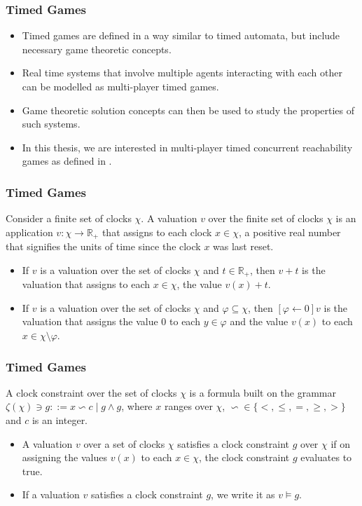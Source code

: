 \documentclass{beamer}
\begin{document}
\begin{frame}
\frametitle{Timed Games}
  \begin{itemize}
 	\item Timed games are defined in a way similar to timed automata, but include necessary game theoretic concepts.
 	\item Real time systems that involve multiple agents interacting with each other can be modelled as multi-player timed games. 
 	\item Game theoretic solution concepts can then be used to study the properties of such systems.
 	\item In this thesis, we are interested in multi-player timed concurrent reachability games as defined in \cite{BBM-concur10,BBM-report}.
  \end{itemize}
\end{frame}

\begin{frame}
\frametitle{Timed Games}
\begin{definition}
Consider a finite set of clocks $\chi$. A valuation $v$ over the finite set of clocks $\chi$ is an application $v: \chi \rightarrow \mathbb{R}_{+}$ that assigns to each clock $x \in \chi$, a positive real number that signifies the units of time since the clock $x$ was last reset.
\end{definition}
  \begin{itemize}
 	\item If $v$ is a valuation over the set of clocks $\chi$ and $t \in \mathbb{R}_{+}$, then $v + t$ is the valuation that assigns to each $x \in \chi$, the value $v(x) + t$.
 	\item If $v$ is a valuation over the set of clocks $\chi$ and $\varphi \subseteq \chi$, then $[\varphi \leftarrow 0]v$ is the valuation that assigns the value $0$ to each $y \in \varphi$ and the value $v(x)$ to each $x \in \chi \setminus \varphi$.
  \end{itemize}
\end{frame}

\begin{frame}
\frametitle{Timed Games}
\begin{definition}
A clock constraint over the set of clocks $\chi$ is a formula built on the grammar $\zeta(\chi) \ni g ::= x \backsim c \; \vert \; g \wedge g$, where $x$ ranges over $\chi$, $\backsim \in \lbrace <, \leq, =, \geq, > \rbrace$ and $c$ is an integer.
\end{definition}
  \begin{itemize}
 	\item A valuation $v$ over a set of clocks $\chi$ satisfies a clock constraint $g$ over $\chi$ if on assigning the values $v(x)$ to each $x \in \chi$, the clock constraint $g$ evaluates to true.
 	\item If a valuation $v$ satisfies a clock constraint $g$, we write it as $v \models g$.
  \end{itemize}
\end{frame}
\end{document}
